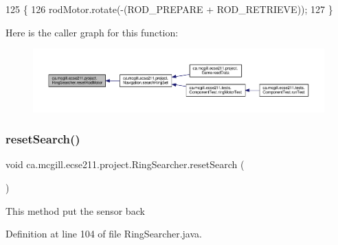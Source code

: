 \begin{DoxyCode}
125                               \{
126     rodMotor.rotate(-(ROD\_PREPARE + ROD\_RETRIEVE));
127   \}
\end{DoxyCode}
Here is the caller graph for this function\+:\nopagebreak
\begin{figure}[H]
\begin{center}
\leavevmode
\includegraphics[width=350pt]{classca_1_1mcgill_1_1ecse211_1_1project_1_1_ring_searcher_a8b0ea0bf4cd07b6c8a090c3e9bc8eb04_icgraph}
\end{center}
\end{figure}
\mbox{\label{classca_1_1mcgill_1_1ecse211_1_1project_1_1_ring_searcher_ad73c50b29163d91292de418101cce21e}} 
\subsubsection{\texorpdfstring{reset\+Search()}{resetSearch()}}
{\footnotesize\ttfamily void ca.\+mcgill.\+ecse211.\+project.\+Ring\+Searcher.\+reset\+Search (\begin{DoxyParamCaption}{ }\end{DoxyParamCaption})}

This method put the sensor back 

Definition at line 104 of file Ring\+Searcher.\+java.


